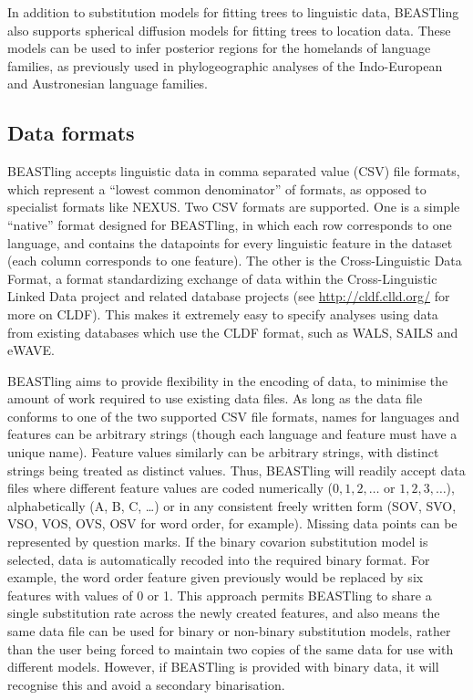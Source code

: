 \documentclass[twocolumn,10pt]{scrartcl}
\begin{document}
In addition to substitution models for fitting trees to linguistic data, BEASTling also supports spherical diffusion models\cite{Bouckaert2016} for fitting trees to location data.  These models can be used to infer posterior regions for the homelands of language families, as previously used in phylogeographic analyses of the Indo-European and Austronesian language families.

\subsection{Data formats}

BEASTling accepts linguistic data in comma
separated value (CSV) file formats, which represent a ``lowest common denominator'' of formats, as opposed to specialist formats like NEXUS.  Two CSV formats are supported.  One is a simple ``native'' format designed for BEASTling, in which each row corresponds to one language, and contains the datapoints for every linguistic feature in the dataset (each column corresponds to one feature).  The other is the Cross-Linguistic Data Format\cite{Forkel2016}, a format standardizing exchange of data within the Cross-Linguistic Linked Data project and related database projects (see \url{http://cldf.clld.org/} for more on CLDF).  This makes it extremely easy to specify analyses using data from existing databases which use the CLDF format, such as WALS, SAILS and eWAVE\cite{Kortmann2013}.

BEASTling aims to provide flexibility in the encoding of data, to minimise the amount of work required to use existing data files.  As long as the data file conforms to one of the two supported CSV file formats, names for languages and features can be arbitrary strings (though each language and feature must have a unique name).  Feature values similarly can be arbitrary strings, with distinct strings being treated as distinct values.  Thus, BEASTling will readily accept data files where different feature values are coded numerically ($0, 1, 2,\ldots$ or $1, 2, 3,\ldots$), alphabetically (A, B, C, \ldots) or in any consistent freely written form (SOV, SVO, VSO, VOS, OVS, OSV for word order, for example).  Missing data points can be represented by question marks.  If the binary covarion substitution model is selected, data is automatically recoded into the required binary format.  For example, the word order feature given previously would be replaced by six features with values of 0 or 1.  This approach permits BEASTling to share a single substitution rate across the newly created features, and also means the same data file can be used for binary or non-binary substitution models, rather than the user being forced to maintain two copies of the same data for use with different models.  However, if BEASTling is provided with binary data, it will recognise this and avoid a secondary binarisation.
\end{document}
